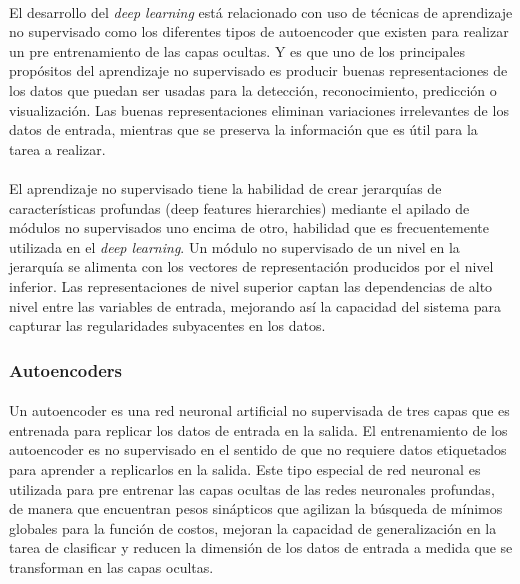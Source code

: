 \documentclass[12pt]{article}%
\begin{document}
\paragraph{}
El desarrollo del \textit{deep learning} está relacionado con uso de técnicas de aprendizaje no supervisado como los diferentes tipos de autoencoder que existen para realizar un pre entrenamiento de las capas ocultas. Y es que uno de los principales propósitos del aprendizaje no supervisado es producir buenas representaciones de los datos \cite{ranzato} que puedan ser usadas para la detección, reconocimiento, predicción o visualización. Las buenas representaciones eliminan variaciones irrelevantes de los datos de entrada, mientras que se preserva la información que es útil para la tarea a realizar.

\paragraph{}
El aprendizaje no supervisado tiene la habilidad de crear jerarquías de características profundas (deep features hierarchies) mediante el apilado de módulos no supervisados uno encima de otro, habilidad que es frecuentemente utilizada en el \textit{deep learning}. Un módulo no supervisado de un nivel en la jerarquía se alimenta con los vectores de representación producidos por el nivel inferior. Las representaciones de nivel superior captan las dependencias de alto nivel entre las variables de entrada, mejorando así la capacidad del sistema para capturar las regularidades subyacentes en los datos.

\subsubsection{Autoencoders}
\paragraph{}
Un autoencoder es una red neuronal artificial no supervisada de tres capas que es entrenada para replicar los datos de entrada en la salida. El entrenamiento de los autoencoder es no supervisado en el sentido de que no requiere datos etiquetados para aprender a replicarlos en la salida. Este tipo especial de red neuronal es utilizada para pre entrenar las capas ocultas de las redes neuronales profundas, de manera que encuentran pesos sinápticos que agilizan la búsqueda de mínimos globales para la función de costos, mejoran la capacidad de generalización en la tarea de clasificar y reducen la dimensión de los datos de entrada a medida que se transforman en las capas ocultas.
\end{document}
